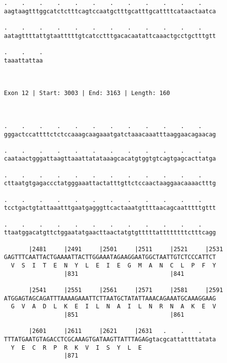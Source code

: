 \documentclass{article}
\begin{document}
\begin{Verbatim}
.    .    .    .    .    .    .    .    .    .    .    .    
aagtaagtttggcatctctttcagtccaatgctttgcatttgcattttcataactaatca
                                                            
.    .    .    .    .    .    .    .    .    .    .    .    
aatagttttattgtaatttttgtcatcctttgacacaatattcaaactgcctgctttgtt
                                                            
.    .    .
taaattattaa
           
           
 
Exon 12 | Start: 3003 | End: 3163 | Length: 160



.    .    .    .    .    .    .    .    .    .    .    .    
gggactccattttctctccaaagcaagaaatgatctaaacaaatttaaggaacagaacag
                                                            
.    .    .    .    .    .    .    .    .    .    .    .    
caataactgggattaagttaaattatataaagcacatgtggtgtcagtgagcacttatga
                                                            
.    .    .    .    .    .    .    .    .    .    .    .    
cttaatgtgagaccctatgggaaattactatttgttctccaactaaggaacaaaactttg
                                                            
.    .    .    .    .    .    .    .    .    .    .    .    
tcctgactgtattaaatttgaatgagggttcactaaatgttttaacagcaatttttgttt
                                                            
.    .    .    .    .    .    .    .    .    .    .    .    
ttaatggacatgttctggaatatgaacttaactatgtgtttttattttttttctttcagg
                                                            
       |2481     |2491     |2501     |2511     |2521     |2531
GAGTTTCAATTACTGAAAATTACTTGGAAATAGAAGGAATGGCTAATTGTCTCCCATTCT
  V  S  I  T  E  N  Y  L  E  I  E  G  M  A  N  C  L  P  F  Y
                 |831                          |841         
  
       |2541     |2551     |2561     |2571     |2581     |2591
ATGGAGTAGCAGATTTAAAAGAAATTCTTAATGCTATATTAAACAGAAATGCAAAGGAAG
  G  V  A  D  L  K  E  I  L  N  A  I  L  N  R  N  A  K  E  V
                 |851                          |861         
  
       |2601     |2611     |2621     |2631   .    .    .    
TTTATGAATGTAGACCTCGCAAAGTGATAAGTTATTTAGAGgtacgcattattttatata
  Y  E  C  R  P  R  K  V  I  S  Y  L  E                     
                 |871                                       
  

\end{Verbatim}
\end{document}
